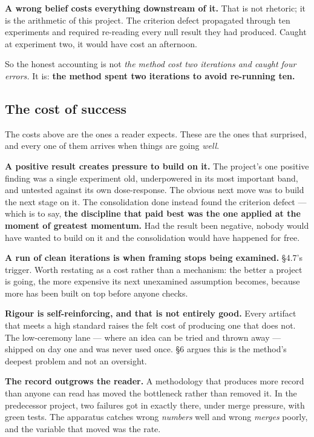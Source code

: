 \textbf{A wrong belief costs everything downstream of it.} That is not rhetoric; it is the arithmetic of this project. The criterion defect propagated through ten experiments and required re-reading every null result they had produced. Caught at experiment two, it would have cost an afternoon.

So the honest accounting is not \textit{the method cost two iterations and caught four errors.} It is: \textbf{the method spent two iterations to avoid re-running ten.}

\subsection{The cost of success}

The costs above are the ones a reader expects. These are the ones that surprised, and every one of them arrives when things are going \textit{well}.

\textbf{A positive result creates pressure to build on it.} The project's one positive finding was a single experiment old, underpowered in its most important band, and untested against its own dose-response. The obvious next move was to build the next stage on it. The consolidation done instead found the criterion defect --- which is to say, \textbf{the discipline that paid best was the one applied at the moment of greatest momentum.} Had the result been negative, nobody would have wanted to build on it and the consolidation would have happened for free.

\textbf{A run of clean iterations is when framing stops being examined.} \S4.7's trigger. Worth restating as a cost rather than a mechanism: the better a project is going, the more expensive its next unexamined assumption becomes, because more has been built on top before anyone checks.

\textbf{Rigour is self-reinforcing, and that is not entirely good.} Every artifact that meets a high standard raises the felt cost of producing one that does not. The low-ceremony lane --- where an idea can be tried and thrown away --- shipped on day one and was never used once. \S6 argues this is the method's deepest problem and not an oversight.

\textbf{The record outgrows the reader.} A methodology that produces more record than anyone can read has moved the bottleneck rather than removed it. In the predecessor project, two failures got in exactly there, under merge pressure, with green tests. The apparatus catches wrong \textit{numbers} well and wrong \textit{merges} poorly, and the variable that moved was the rate.


